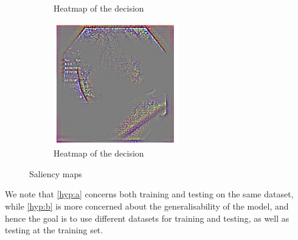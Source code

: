 \begin{figure}
\begin{subfigure}[b]{0.3\textwidth}
         \caption{Heatmap of the decision}
         \label{fig:sal5}
     \end{subfigure}     
     \hfill
     \begin{subfigure}[b]{0.3\textwidth}
         \centering
         \includegraphics[width=\textwidth]{methodology/figures/sal7.png}
         \caption{Heatmap of the decision}
         \label{fig:sal7}
     \end{subfigure}
     \caption{Saliency maps}
     \label{fig:Saliencymasks2}
\end{figure}



We note that \ref{hyp:a} concerns both training and testing on the same dataset, while \ref{hyp:b} is more concerned about the generalisability of the model, and hence the goal is to use different datasets for training and testing, as well as testing at the training set. 





